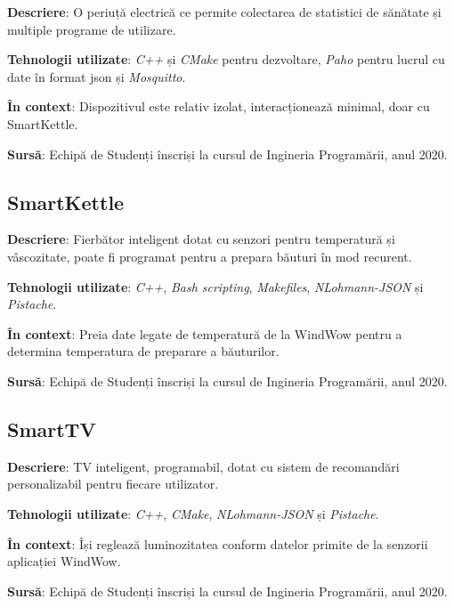 \textbf{Descriere}: O periuță electrică ce permite colectarea de statistici de sănătate și multiple programe de utilizare.

\textbf{Tehnologii utilizate}: \textit{C++} și \textit{CMake} pentru dezvoltare, \textit{Paho} pentru lucrul cu date în format \acrshort{json} și \textit{Mosquitto}.

\textbf{În context}: Dispozitivul este relativ izolat, interacționează minimal, doar cu SmartKettle.

\textbf{Sursă}: Echipă de Studenți înscriși la cursul de Ingineria Programării, anul 2020.

\subsection*{SmartKettle}

\textbf{Descriere}: Fierbător inteligent dotat cu senzori pentru temperatură și vâscozitate, poate fi programat pentru a prepara băuturi în mod recurent.

\textbf{Tehnologii utilizate}: \textit{C++}, \textit{Bash scripting}, \textit{Makefiles}, \textit{NLohmann-JSON} și \textit{Pistache}.

\textbf{În context}: Preia date legate de temperatură de la WindWow pentru a determina temperatura de preparare a băuturilor.

\textbf{Sursă}: Echipă de Studenți înscriși la cursul de Ingineria Programării, anul 2020.

\subsection*{SmartTV}

\textbf{Descriere}: TV inteligent, programabil, dotat cu sistem de recomandări personalizabil pentru fiecare utilizator.

\textbf{Tehnologii utilizate}: \textit{C++}, \textit{CMake}, \textit{NLohmann-JSON} și \textit{Pistache}.

\textbf{În context}: Își reglează luminozitatea conform datelor primite de la senzorii aplicației WindWow.

\textbf{Sursă}: Echipă de Studenți înscriși la cursul de Ingineria Programării, anul 2020.

